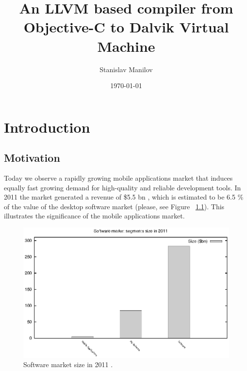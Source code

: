 \documentclass[parskip]{cs4rep}
\begin{document}
\title{An LLVM based compiler from Objective-C to Dalvik Virtual Machine}

\author{Stanislav Manilov}



\date{\today}


\maketitle

\tableofcontents


\chapter{Introduction}

\section{Motivation}

Today we observe a rapidly growing mobile applications market \cite{P1}
that induces equally fast growing demand for high-quality and reliable development
tools. In 2011 the market generated a revenue of \$5.5 bn \cite{P1},
which is estimated to be 6.5 \% of the value of the desktop software market
(please, see Figure ~\ref{fig:softwareMarket2011}). This illustrates the significance of the mobile applications market.

\begin{figure}[h!]
    \centering
        \includegraphics[width=1.0\textwidth]{markets}
    \caption{Software market size in 2011 \cite{P1} \cite{P2} \cite{P3}.}
    \label{fig:softwareMarket2011}
\end{figure}
\end{document}
